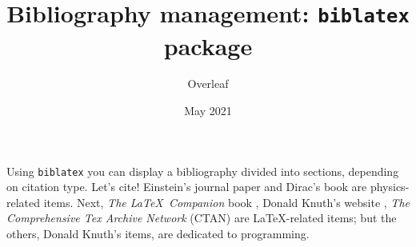 \documentclass{article}
\title{Bibliography management: \texttt{biblatex} package}
\author{Overleaf}
\date{May 2021}
\begin{document}
\maketitle

Using \texttt{biblatex} you can display a bibliography divided into sections,
depending on citation type. Let's cite! Einstein's journal paper \cite{einstein}
and Dirac's book \cite{dirac} are physics-related items. Next, \textit{The \LaTeX\ Companion}
book \cite{latexcompanion}, Donald Knuth's website \cite{knuthwebsite},
\textit{The Comprehensive Tex Archive Network} (CTAN) \cite{ctan} are
\LaTeX-related items; but the others, Donald Knuth's items,
\cite{knuth-fa,knuth-acp} are dedicated to programming.

\medskip


\printbibliography[type=article,title={Articles only}]
\printbibliography[type=book,title={Books only}]

\printbibliography[keyword={physics},title={Physics-related only}]
\printbibliography[keyword={latex},title={\LaTeX-related only}]
\end{document}
